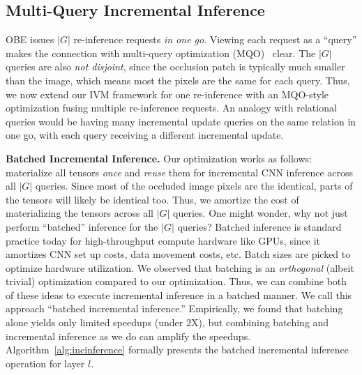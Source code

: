 \subsection{Multi-Query Incremental Inference}
OBE issues $|G|$ re-inference requests \textit{in one go}. Viewing each request as a ``query'' makes the connection with multi-query optimization (MQO)~\cite{sellis1988multiple} clear.
The $|G|$ queries are also \textit{not disjoint}, since the occlusion patch is typically much smaller than the image, which means most the pixels are the same for each query.
Thus, we now extend our IVM framework for one re-inference with an MQO-style optimization fusing multiple re-inference requests.
An analogy with relational queries would be having many incremental update queries on the same relation in one go, with each query receiving a different incremental update. 

\vspace{2mm}
\noindent \textbf{Batched Incremental Inference.}
Our optimization works as follows: materialize all tensors \textit{once} and \textit{reuse} them for incremental CNN inference across all $|G|$ queries. Since most of the occluded image pixels are the identical, parts of the tensors will likely be identical too. Thus, we amortize the cost of materializing the tensors across all $|G|$ queries. One might wonder, why not just perform ``batched'' inference for the $|G|$ queries? Batched inference is standard practice today for high-throughput compute hardware like GPUs, since it amortizes CNN set up costs, data movement costs, etc. Batch sizes are picked to optimize hardware utilization. We observed that batching is an \textit{orthogonal} (albeit trivial) optimization compared to our optimization. Thus, we can combine both of these ideas to execute incremental inference in a batched manner. We call this approach ``batched incremental inference.'' Empirically, we found that batching alone yields only limited speedups (under $2$X), but combining batching and incremental inference as we do can amplify the speedups. Algorithm~\ref{alg:incinference} formally presents the batched incremental inference operation for layer $l$.

